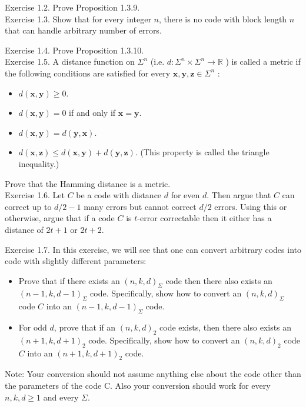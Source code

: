 \documentclass[10pt]{article}
\begin{document}
Exercise 1.2. Prove Proposition 1.3.9.\\
Exercise 1.3. Show that for every integer $n$, there is no code with block length $n$ that can handle arbitrary number of errors.

Exercise 1.4. Prove Proposition 1.3.10.\\
Exercise 1.5. A distance function on $\Sigma^{n}$ (i.e. $d: \Sigma^{n} \times \Sigma^{n} \rightarrow \mathbb{R}$ ) is called a metric if the following conditions are satisfied for every $\mathbf{x}, \mathbf{y}, \mathbf{z} \in \Sigma^{n}$ :

\begin{itemize}
  \item[1.] $d(\mathbf{x}, \mathbf{y}) \geq 0$.
  \item[2.] $d(\mathbf{x}, \mathbf{y})=0$ if and only if $\mathbf{x}=\mathbf{y}$.
  \item[3.] $d(\mathbf{x}, \mathbf{y})=d(\mathbf{y}, \mathbf{x})$.
  \item[4.] $d(\mathbf{x}, \mathbf{z}) \leq d(\mathbf{x}, \mathbf{y})+d(\mathbf{y}, \mathbf{z})$. (This property is called the triangle inequality.)
\end{itemize}

Prove that the Hamming distance is a metric.\\
Exercise 1.6. Let $C$ be a code with distance $d$ for even $d$. Then argue that $C$ can correct up to $d / 2-1$ many errors but cannot correct $d / 2$ errors. Using this or otherwise, argue that if a code $C$ is $t$-error correctable then it either has a distance of $2 t+1$ or $2 t+2$.

Exercise 1.7. In this exercise, we will see that one can convert arbitrary codes into code with slightly different parameters:

\begin{itemize}
  \item[1.] Prove that if there exists an $(n, k, d)_{\Sigma}$ code then there also exists an $(n-1, k, d-1)_{\Sigma}$ code. Specifically, show how to convert an $(n, k, d)_{\Sigma}$ code $C$ into an $(n-1, k, d-1)_{\Sigma}$ code.
  \item[2.] For odd $d$, prove that if an $(n, k, d)_{2}$ code exists, then there also exists an $(n+1, k, d+1)_{2}$ code. Specifically, show how to convert an $(n, k, d)_{2}$ code $C$ into an $(n+1, k, d+1)_{2}$ code.
\end{itemize}

Note: Your conversion should not assume anything else about the code other than the parameters of the code C. Also your conversion should work for every $n, k, d \geq 1$ and every $\Sigma$.
\end{document}
